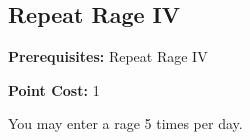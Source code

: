 \subsection{Repeat Rage IV}\label{feat:repeatrage4}

\noindent
\textbf{Prerequisites:} Repeat Rage IV

\noindent
\textbf{Point Cost:} 1

You may enter a rage 5 times per day.
